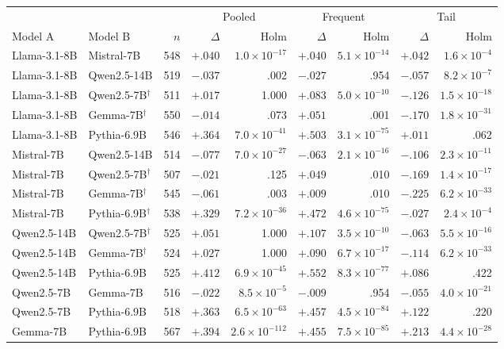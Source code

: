 \begin{tabular}{llrrrrrrr}
\toprule
& & & \multicolumn{2}{c}{Pooled} & \multicolumn{2}{c}{Frequent} & \multicolumn{2}{c}{Tail} \\
\cmidrule(lr){4-5} \cmidrule(lr){6-7} \cmidrule(lr){8-9}
Model A & Model B & $n$ & $\Delta$ & Holm & $\Delta$ & Holm & $\Delta$ & Holm \\
\midrule
Llama-3.1-8B & Mistral-7B & 548 & $+.040$ & $1.0{\times}10^{-17}$ & $+.040$ & $5.1{\times}10^{-14}$ & $+.042$ & $1.6{\times}10^{-4}$ \\
Llama-3.1-8B & Qwen2.5-14B & 519 & $-.037$ & .002 & $-.027$ & .954 & $-.057$ & $8.2{\times}10^{-7}$ \\
Llama-3.1-8B & Qwen2.5-7B$^{\dagger}$ & 511 & $+.017$ & 1.000 & $+.083$ & $5.0{\times}10^{-10}$ & $-.126$ & $1.5{\times}10^{-18}$ \\
Llama-3.1-8B & Gemma-7B$^{\dagger}$ & 550 & $-.014$ & .073 & $+.051$ & .001 & $-.170$ & $1.8{\times}10^{-31}$ \\
Llama-3.1-8B & Pythia-6.9B & 546 & $+.364$ & $7.0{\times}10^{-41}$ & $+.503$ & $3.1{\times}10^{-75}$ & $+.011$ & .062 \\
Mistral-7B & Qwen2.5-14B & 514 & $-.077$ & $7.0{\times}10^{-27}$ & $-.063$ & $2.1{\times}10^{-16}$ & $-.106$ & $2.3{\times}10^{-11}$ \\
Mistral-7B & Qwen2.5-7B$^{\dagger}$ & 507 & $-.021$ & .125 & $+.049$ & .010 & $-.169$ & $1.4{\times}10^{-17}$ \\
Mistral-7B & Gemma-7B$^{\dagger}$ & 545 & $-.061$ & .003 & $+.009$ & .010 & $-.225$ & $6.2{\times}10^{-33}$ \\
Mistral-7B & Pythia-6.9B$^{\dagger}$ & 538 & $+.329$ & $7.2{\times}10^{-36}$ & $+.472$ & $4.6{\times}10^{-75}$ & $-.027$ & $2.4{\times}10^{-4}$ \\
Qwen2.5-14B & Qwen2.5-7B$^{\dagger}$ & 525 & $+.051$ & 1.000 & $+.107$ & $3.5{\times}10^{-10}$ & $-.063$ & $5.5{\times}10^{-16}$ \\
Qwen2.5-14B & Gemma-7B$^{\dagger}$ & 524 & $+.027$ & 1.000 & $+.090$ & $6.7{\times}10^{-17}$ & $-.114$ & $6.2{\times}10^{-33}$ \\
Qwen2.5-14B & Pythia-6.9B & 525 & $+.412$ & $6.9{\times}10^{-45}$ & $+.552$ & $8.3{\times}10^{-77}$ & $+.086$ & .422 \\
Qwen2.5-7B & Gemma-7B & 516 & $-.022$ & $8.5{\times}10^{-5}$ & $-.009$ & .954 & $-.055$ & $4.0{\times}10^{-21}$ \\
Qwen2.5-7B & Pythia-6.9B & 518 & $+.363$ & $6.5{\times}10^{-63}$ & $+.457$ & $4.5{\times}10^{-84}$ & $+.122$ & .220 \\
Gemma-7B & Pythia-6.9B & 567 & $+.394$ & $2.6{\times}10^{-112}$ & $+.455$ & $7.5{\times}10^{-85}$ & $+.213$ & $4.4{\times}10^{-28}$ \\
\bottomrule
\end{tabular}
